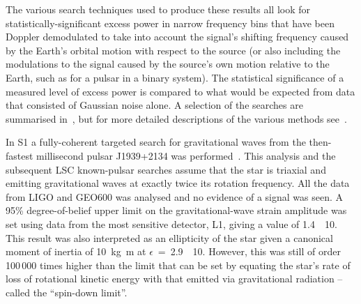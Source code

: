 \documentclass{article}
\begin{document}
The various search techniques used to produce these results all look for
statistically-significant excess power in narrow frequency bins that have been
Doppler demodulated to take into account the signal's shifting frequency caused
by the Earth's orbital motion with respect to the source (or also including the
modulations to the signal caused by the source's own motion relative to the
Earth, such as for a pulsar in a binary system). The statistical significance of
a measured level of excess power is compared to what would be expected from data
that consisted of Gaussian noise alone. A selection of the searches are
summarised in~\cite{Prix:2006}, but for more detailed descriptions of the
various methods see~\cite{Brady:2000, Krishnan:2004, Jaranowski:1998,
Abbott:2008e, Abbott:2007a, Dupuis:2005}.

In S1 a fully-coherent targeted search for gravitational waves from the then-fastest millisecond pulsar J1939+2134 was performed~\cite{Abbott:2004d}. This
analysis and the subsequent LSC known-pulsar searches assume that the star is
triaxial and emitting gravitational waves at exactly twice its rotation
frequency. All the data from LIGO and GEO600 was analysed and no evidence of a
signal was seen. A 95\% degree-of-belief upper limit on the gravitational-wave
strain amplitude was set using data from the most sensitive detector, L1, giving
a value of 1.4~\texttimes~10. This result was also interpreted as an
ellipticity of the star given a canonical moment of inertia of
10~kg~m at
$\epsilon$~=~2.9~\texttimes~10.  However, this was still of
order 100\,000 times higher than the limit that can be set by equating
the star's rate of loss of rotational kinetic energy with that emitted
via gravitational radiation -- called the ``spin-down limit''.
\end{document}
